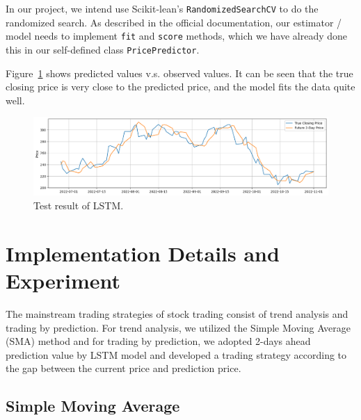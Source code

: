 \documentclass[a4paper, 11pt]{my-elegantpaper}
\begin{document}
In our project, we intend use Scikit-lean's \texttt{RandomizedSearchCV} to do the randomized search. As described in the official documentation, our estimator / model needs to implement \texttt{fit} and \texttt{score} methods, which we have already done this in our self-defined class \texttt{PricePredictor}.

Figure~\ref{fig:3} shows predicted values v.s. observed values. It can be seen that the true closing price is very close to the predicted price, and the model fits the data quite well.

\begin{figure}[H]
    \centering
    \includegraphics[scale=0.4]{figures/lstm-pred.png}
    \caption{Test result of LSTM.}
    \label{fig:3}
\end{figure}


\section{Implementation Details and Experiment} \label{sec:3}

The mainstream trading strategies of stock trading consist of trend analysis and trading by prediction. For trend analysis, we utilized the Simple Moving Average (SMA) method and for trading by prediction, we adopted 2-days ahead prediction value by LSTM model and developed a trading strategy according to the gap between the current price and prediction price.


\subsection{Simple Moving Average}
\end{document}
